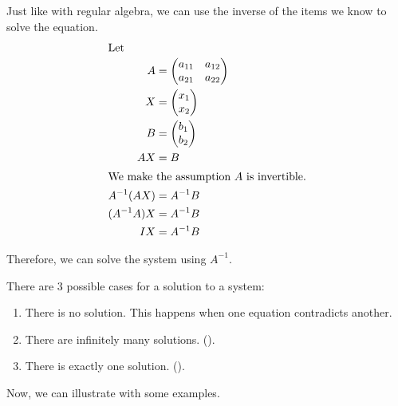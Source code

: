 \begin{blackbox}
  Just like with regular algebra, we can use the inverse of the items we know to solve the equation.
  \begin{align*}
    \intertext{Let}
    A &=
        \begin{pmatrix}
          a_{11} & a_{12} \\
          a_{21} & a_{22}
        \end{pmatrix} \\
    X &=
        \begin{pmatrix}
          x_{1} \\
          x_{2}
        \end{pmatrix} \\
    B &=
        \begin{pmatrix}
          b_{1} \\
          b_{2}
        \end{pmatrix} \\
    AX &= B \\
    \shortintertext{We make the assumption $A$ is invertible.}
    A^{-1} (A X) &= A^{-1} B \\
    (A^{-1} A) X &= A^{-1} B \\
    I X &= A^{-1} B
  \end{align*}

  Therefore, we can solve the system using $A^{-1}$.
\end{blackbox}

There are 3 possible cases for a solution to a system:
\begin{enumerate}[noitemsep]
\item There is no solution. This happens when one equation contradicts another.
\item There are infinitely many solutions. ().
\item There is exactly one solution. ().
\end{enumerate}

Now, we can illustrate with some examples.

